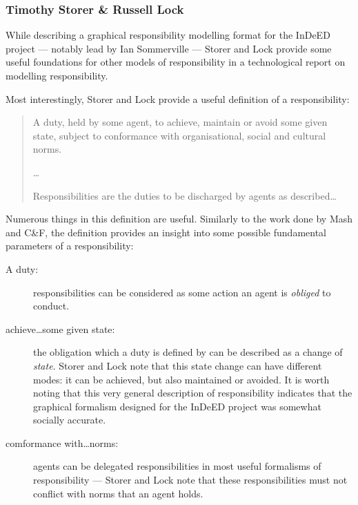 \subsubsection{Timothy Storer \& Russell Lock}
While describing a graphical responsibility modelling format for the InDeED project --- notably lead by Ian Sommerville --- Storer and Lock provide some useful foundations for other models of responsibility in a technological report on modelling responsibility\cite{storer2008modelling}.\par

Most interestingly, Storer and Lock provide a useful definition of a responsibility:

\begin{quotation}
    A duty, held by some agent, to achieve, maintain or avoid some given state, subject to conformance with organisational, social and cultural norms.\cite{storer2008modelling}\par
    
    \ldots{}\par
    
    Responsibilities are the duties to be discharged by agents as described\ldots{}
\end{quotation}

Numerous things in this definition are useful. Similarly to the work done by Mash and C\&F, the definition provides an insight into some possible fundamental parameters of a responsibility:

\begin{description}
    \item [A duty: ] responsibilities can be considered as some action an agent is \emph{obliged} to conduct.
    \item [achieve\ldots{}some given state: ] the obligation which a duty is defined by can be described as a change of \emph{state}. Storer and Lock note that this state change can have different modes: it can be achieved, but also maintained or avoided. It is worth noting that this very general description of responsibility indicates that the graphical formalism designed for the InDeED project was somewhat socially accurate.
    \item [comformance with\ldots{}norms: ] agents can be delegated responsibilities in most useful formalisms of responsibility --- Storer and Lock note that these responsibilities must not conflict with norms that an agent holds.
\end{description}

